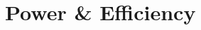 \documentclass[12pt,compress,aspectratio=169]{beamer}
\newcommand{\pic}[2]{\texttt{[image: \#2]}}
\begin{document}





\section{Power \& Efficiency}
\end{document}
